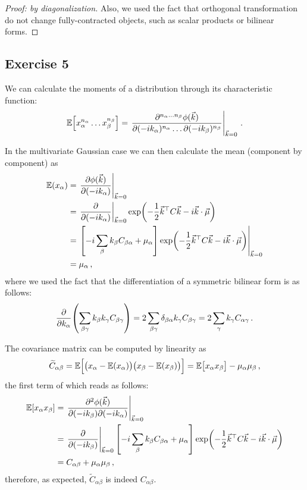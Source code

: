 \documentclass[main.tex]{subfiles}
\begin{document}
\begin{proof}[Proof: by diagonalization]
Also, we used the fact that orthogonal transformation do not change fully-contracted objects, such as scalar products or bilinear forms.
\end{proof}

\subsection*{Exercise 5}

We can calculate the moments of a distribution through its characteristic function: 
%
\begin{align}
\mathbb{E} \qty[x_\alpha^{n_\alpha } \dots x_\beta^{n_\beta }]
= \eval{\frac{\partial^{n_\alpha \dots n_\beta } \phi (\vec{k})}{\partial(- i k_\alpha )^{n_\alpha } \dots \partial(-i k_\beta )^{n_\beta }}}_{\vec{k} = 0}
\,.
\end{align}

In the multivariate Gaussian case we can then calculate the mean (component by component) as 
%
\begin{align}
\mathbb{E}(x_\alpha ) &= \eval{\pdv{\phi (\vec{k})}{(-i k_\alpha )}}_{\vec{k} = 0}  \\
&= \eval{\pdv{}{(-i k_\alpha )}}_{\vec{k} = 0}
\exp(- \frac{1}{2} \vec{k}^{\top} C \vec{k} - i \vec{k} \cdot \vec{\mu })  \\
&= \eval{\qty[- i \sum_\beta  k_\beta  C_{\beta  \alpha } + \mu _\alpha ] \exp(- \frac{1}{2} \vec{k}^{\top} C \vec{k} - i \vec{k} \cdot \vec{\mu })}_{\vec{k} = 0}  \\
&= \mu _\alpha 
\,,
\end{align}
%
where we used the fact that the differentiation of a symmetric bilinear form is as follows: 
%
\begin{align}
\pdv{}{k_\alpha } \qty(\sum _{\beta \gamma } k_\beta k_\gamma C_{\beta \gamma }) = 2 \sum _{\beta \gamma } \delta_{\beta \alpha } k_\gamma C_{\beta \gamma } = 2 \sum_{\gamma } k_\gamma C_{\alpha \gamma }
\,.
\end{align}

The covariance matrix can be computed by linearity as
%
\begin{align}
\widetilde{C}_{\alpha \beta } = \mathbb{E}\qty[\qty(x_ \alpha - \mathbb{E}(x_\alpha )) \qty(x_\beta - \mathbb{E}(x_\beta ))] 
= \mathbb{E}\qty[x_\alpha  x_\beta ] - \mu _\alpha \mu _\beta 
\,,
\end{align}
%
the first term of which reads as follows: 
%
\begin{align}
\mathbb{E}[x_\alpha x_\beta ] &= \eval{\pdv[2]{\phi (\vec{k})}{(-i k_\beta  )}{(-i k_\alpha  )}}_{\vec{k} = 0}  \\
&= \eval{\pdv{}{(-i k_\beta )}}_{\vec{k} = 0} \qty[-i \sum _{\beta } k_\beta C_{\beta \alpha } + \mu _\alpha ] \exp(- \frac{1}{2} \vec{k}^{\top} C \vec{k} - i \vec{k} \cdot \vec{\mu })  \\
&= C_{\alpha \beta } + \mu _\alpha \mu _\beta 
\,,
\end{align}
%
therefore, as expected, \(\widetilde{C}_{\alpha \beta }\) is indeed \(C_{\alpha \beta }\). 
\end{document}

